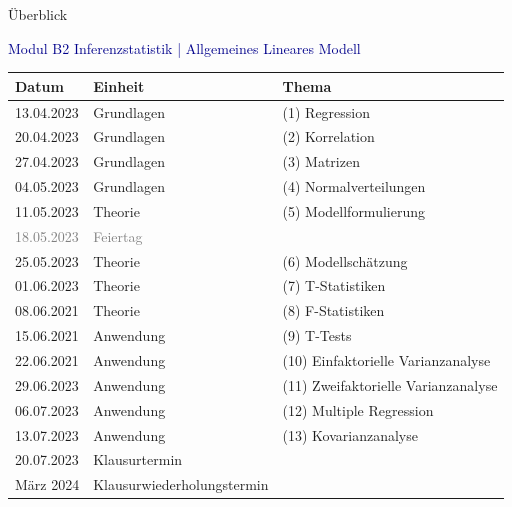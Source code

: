 \documentclass[
  8pt,
  ignorenonframetext,
]{beamer}
\begin{document}
\begin{frame}{Überblick}
\protect\hypertarget{uxfcberblick}{}
\vspace{1mm}

\textcolor{darkblue}{Modul B2 Inferenzstatistik | Allgemeines Lineares Modell}
\small \center \footnotesize \renewcommand{\arraystretch}{1.1}

\begin{tabular}{lll}
Datum       & Einheit                       & Thema                                             \\\hline
13.04.2023  & Grundlagen                    & (1) Regression                                  \\
20.04.2023  & Grundlagen                    & (2) Korrelation                             \\
27.04.2023  & Grundlagen                    & (3) Matrizen                              \\
04.05.2023  & Grundlagen                    & (4) Normalverteilungen                    \\
11.05.2023  & Theorie                       & (5) Modellformulierung                    \\
\textcolor{gray}{18.05.2023}                &  \textcolor{gray}{Feiertag} &             \\  
25.05.2023  & Theorie                       & (6) Modellschätzung                       \\
01.06.2023  & Theorie                       & (7) T-Statistiken                         \\
08.06.2021  & Theorie                       & (8) F-Statistiken                         \\
15.06.2021  & Anwendung                     & (9) T-Tests                               \\
22.06.2021  & Anwendung                     & (10) Einfaktorielle Varianzanalyse        \\
29.06.2023  & Anwendung                     & (11) Zweifaktorielle Varianzanalyse       \\
06.07.2023  & Anwendung                     & (12) Multiple Regression                  \\
13.07.2023  & Anwendung                     & (13) Kovarianzanalyse                     \\\hline
20.07.2023  & Klausurtermin                 &                                           \\
März 2024   & Klausurwiederholungstermin    &
\end{tabular}
\end{frame}
\end{document}
